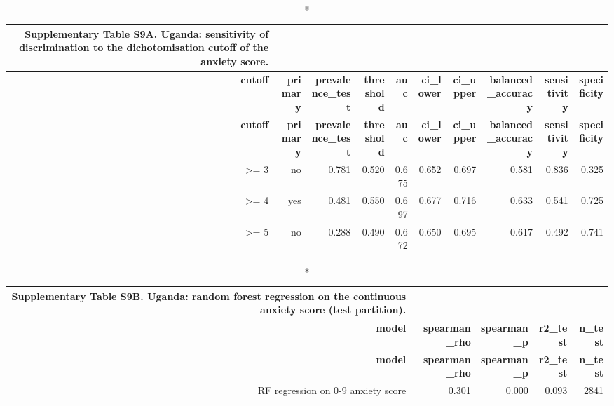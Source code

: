 \documentclass[10pt]{article}
\begin{document}
\tiny
\setlength{\tabcolsep}{2pt}
\begin{longtable}{rrrrrrrrrr}
\caption*{\textbf{Supplementary Table S9A.} Uganda: sensitivity of discrimination to the dichotomisation cutoff of the anxiety score.}\\
\toprule
\textbf{cutoff} & \textbf{primary} & \textbf{prevalence\_test} & \textbf{threshold} & \textbf{auc} & \textbf{ci\_lower} & \textbf{ci\_upper} & \textbf{balanced\_accuracy} & \textbf{sensitivity} & \textbf{specificity} \\
\midrule
\endfirsthead
\toprule
\textbf{cutoff} & \textbf{primary} & \textbf{prevalence\_test} & \textbf{threshold} & \textbf{auc} & \textbf{ci\_lower} & \textbf{ci\_upper} & \textbf{balanced\_accuracy} & \textbf{sensitivity} & \textbf{specificity} \\
\midrule
\endhead
\bottomrule
\endfoot
>= 3 & no & 0.781 & 0.520 & 0.675 & 0.652 & 0.697 & 0.581 & 0.836 & 0.325 \\
>= 4 & yes & 0.481 & 0.550 & 0.697 & 0.677 & 0.716 & 0.633 & 0.541 & 0.725 \\
>= 5 & no & 0.288 & 0.490 & 0.672 & 0.650 & 0.695 & 0.617 & 0.492 & 0.741 \\
\bottomrule
\end{longtable}
\normalsize

\tiny
\setlength{\tabcolsep}{2pt}
\begin{longtable}{rrrrr}
\caption*{\textbf{Supplementary Table S9B.} Uganda: random forest regression on the continuous anxiety score (test partition).}\\
\toprule
\textbf{model} & \textbf{spearman\_rho} & \textbf{spearman\_p} & \textbf{r2\_test} & \textbf{n\_test} \\
\midrule
\endfirsthead
\toprule
\textbf{model} & \textbf{spearman\_rho} & \textbf{spearman\_p} & \textbf{r2\_test} & \textbf{n\_test} \\
\midrule
\endhead
\bottomrule
\endfoot
RF regression on 0-9 anxiety score & 0.301 & 0.000 & 0.093 & 2841 \\
\bottomrule
\end{longtable}
\normalsize
\end{document}
